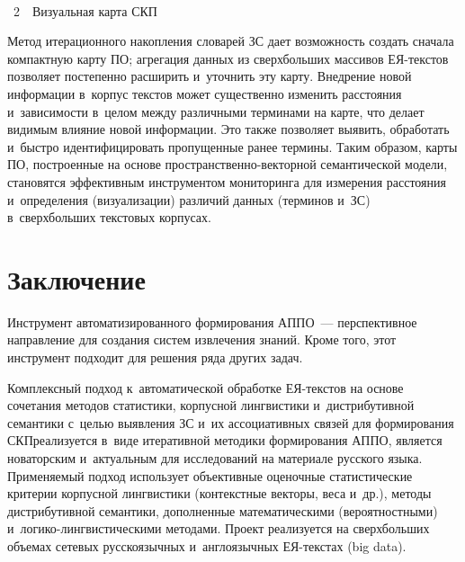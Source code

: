 \begin{multicols}{2}

\noindent
\begin{center}  %
\vspace*{9pt}
\mbox{%
 \epsfxsize=75.912mm
 }




\noindent
{{\figurename~2}\ \ \small{Визуальная карта СКП}}
\end{center}





\addtocounter{figure}{1}




     Метод итерационного накопления словарей ЗС
дает возможность создать сначала компактную карту ПО;
агрегация данных из сверхбольших массивов ЕЯ-текс\-тов позволяет
постепенно расширить и~уточнить эту карту. Внедрение новой информации в~корпус текстов может существенно изменить расстояния и~зависимости в~целом между различными терминами на карте, что делает видимым влияние
новой информации. Это также позволяет выявить, обработать и~быстро
идентифицировать пропущенные ранее термины. Таким образом, карты
ПО, построенные на основе про\-стран\-ст\-вен\-но-век\-тор\-ной
семантической модели, становятся эффективным инструментом мониторинга
для измерения расстояния и~определения (визуализации) различий данных
(терминов и~ЗС) в~сверхбольших текстовых корпусах.

    \section{Заключение}

     Инструмент автоматизированного формирования АППО~---
перспективное направление для создания систем извлечения знаний. Кроме
того, этот инструмент подходит для решения ряда других задач.

     Комплексный подход к~автоматической обработке ЕЯ-текс\-тов на
основе сочетания методов статисти\-ки, корпусной лингвистики и~дистрибутивной семантики с~целью выявления ЗС и~их ассоциативных связей для формирования
СКП\linebreak реализуется в~виде итеративной методики
формирования АППО, является новаторским и~акту\-альным для исследований
на материале русского языка. Применяемый подход использует объективные
оценочные статистические критерии корпусной лингвистики (контекстные
векторы, веса и~др.), методы дистрибутивной семантики, дополненные
математическими (вероятностными) и~логико-лингвистическими методами.
Проект реализуется на сверхбольших объемах сетевых русскоязычных и~англоязычных ЕЯ-текс\-тах (big data).


\end{multicols}
